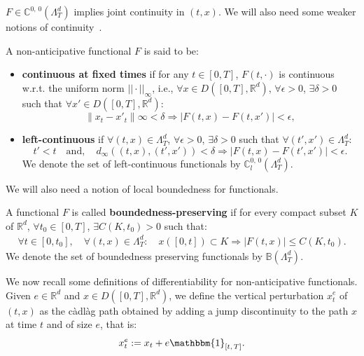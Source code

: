 \documentclass[AHL,Unicode,longabstracts,published]{cedram}
\newcommand{\cadlag}{càdlàg }
\newcommand{\bbC}{\mathbb{C}}
\newcommand{\bbB}{\mathbb{B}}
\newcommand{\bbmun}{\mathbbm{1}}
\newcommand{\Rr}{{\mathbb{R}}}
\let\oldexists\exists
\renewcommand*{\exists}{\mathrel{\oldexists}}
\let\oldforall\forall
\renewcommand*{\forall}{\mathrel{\oldforall}}
\begin{document}
$F\in \bbC^{0,\,0}(\Lambda_T^d)$ implies joint continuity in $(t,{x})$. We will also need some weaker notions of continuity~\cite{cont2012}.
\begin{defi}
A non-anticipative functional $F$ is said to be:
\begin{itemize}
\item \textbf{continuous at fixed times} if for any $t \in [0, T]$, $F(t, \cdot)$ is continuous w.r.t. the uniform norm $||\cdot||_\infty$, i.e., $\forall {x} \in D([0, T], \Rr^d)$, $\forall \epsilon > 0 $, $\exists \delta > 0$ such that $\forall {x}' \in D([0, T], \Rr^d)$:
\[
\left\|{x}_t- {x}'_t\right\|\infty < \delta \Rightarrow \left|F(t, {x}) - F\left(t, {x}'\right)\right| < \epsilon,
\]
\item \textbf{left-continuous} if $\forall (t, {x}) \in \Lambda_T^d$, $\forall \epsilon > 0$, $\exists \delta > 0$ such that $\forall (t', {x}') \in \Lambda_T^d$:
\[
t' < t \quad \text{and}, \quad d_\infty\left((t, {x}), \left(t', {x}'\right)\right) < \delta \Rightarrow \left|F(t, {x}) - F\left(t', {x}'\right)\right| < \epsilon.
\]
We denote the set of left-continuous functionals by $\bbC^{0,\,0}_l(\Lambda_T^d)$.
\end{itemize}
\end{defi}

We will also need a notion of local boundedness for functionals.
\begin{defi}
A functional $F$ is called \textbf{boundedness-preserving} if for every compact subset $K$ of $\Rr^d$, $\forall t_0 \in [0, T]$, $\exists C(K, t_0) > 0$ such that:
\begin{align*}
\forall t \in \left[0, t_0\right],\quad \forall (t, {x}) \in \Lambda_T^d: \quad {x}([0, t]) \subset K \Rightarrow \left|F(t, {x})\right|\leq C\left(K, t_0\right).
\end{align*}
We denote the set of boundedness preserving functionals by $\bbB(\Lambda_T^d)$.
\end{defi}

We now recall some definitions of differentiability for non-anticipative functionals. Given $e \in \Rr^d$ and ${x} \in D([0, T], \Rr^d)$, we define the vertical perturbation ${x}_t^e$ of $(t, {x})$ as the \cadlag path obtained by adding a jump discontinuity to the path ${x}$ at time $t$ and of size $e$, that is:
\[
{x}_t^e := {x}_t + e\bbmun_{[t,\,T]}.
\]
\end{document}
